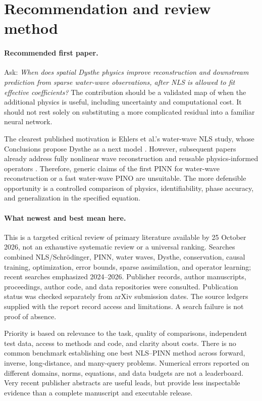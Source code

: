 \section{Recommendation and review method}
\label{sec:recommendation}
\paragraph{Recommended first paper.}
Ask: \emph{When does spatial Dysthe physics improve reconstruction and
downstream prediction from sparse water-wave observations, after NLS is
allowed to fit effective coefficients?} The contribution should be a
validated map of when the additional physics is useful, including
uncertainty and computational cost. It should not rest solely
on substituting a more complicated residual into a familiar neural network.

The clearest published motivation is Ehlers et al.'s water-wave NLS study,
whose Conclusions propose Dysthe as a next model \cite{ehlers2024}.
However, subsequent papers already address fully nonlinear wave
reconstruction and reusable physics-informed operators
\cite{ehlers2025,wavepino}. Therefore, generic claims of the first PINN
for water-wave reconstruction or a fast water-wave PINO are unsuitable.
The more defensible opportunity is a controlled comparison of physics,
identifiability, phase accuracy, and generalization in the specified equation.

\paragraph{What newest and best mean here.}
This is a targeted critical review of primary literature available by
25 October 2026, not an exhaustive systematic review or a universal ranking.
Searches combined NLS/Schr\"odinger, PINN, water waves, Dysthe,
conservation, causal training, optimization, error bounds, sparse
assimilation, and operator learning; recent searches emphasized 2024--2026.
Publisher records, author manuscripts, proceedings, author code, and data
repositories were consulted. Publication status was checked separately from
arXiv submission dates. The source ledgers supplied with the report record
access and limitations. A search failure is not proof of absence.

Priority is based on relevance to the task, quality of comparisons,
independent test data, access to methods and code, and clarity about costs.
There is no common benchmark establishing one best NLS--PINN method across
forward, inverse, long-distance, and many-query problems. Numerical errors
reported on different domains, norms, equations, and data budgets are not a
leaderboard. Very recent publisher abstracts are useful leads, but provide
less inspectable evidence than a complete manuscript and executable release.

